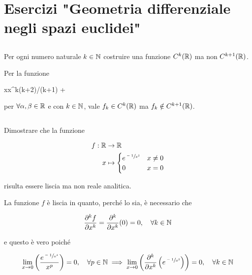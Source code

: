 \chapter{Esercizi "Geometria differenziale negli spazi euclidei"}

\tocless\section{}\label{es1-1}

\begin{tcolorbox}
	Per ogni numero naturale $ k \in \mathbb{N} $ costruire una funzione $ C^{k}(\mathbb{R}) $ ma non $ C^{k+1}(\mathbb{R}) $.
\end{tcolorbox}

Per la funzione

%
	{\R}{\R}%
	{x}{\alpha x^{k(k+2)/(k+1)} + \beta}
	
per $ \forall \alpha,\beta \in \mathbb{R} $ e con $ k \in \mathbb{N} $, vale $ f_{k} \in C^{k}(\mathbb{R}) $ ma $ f_{k} \notin C^{k+1}(\mathbb{R}) $.

\tocless\section{}\label{es1-2}

\begin{tcolorbox}
	Dimostrare che la funzione
	
	\begin{align}
		\begin{split}
			f : \R & \to \R\\
			x &\mapsto%
				\begin{cases}
					e^{\sfrac{-1}{x^{2}}} & x \neq 0\\
					0 & x = 0
				\end{cases}
		\end{split}
	\end{align}
	
	risulta essere liscia ma non reale analitica.
\end{tcolorbox}

La funzione $ f $ è liscia in quanto, perché lo sia, è necessario che

\begin{equation}
	\pdv[k]{f}{x} = \pdv[k]{x} (0) = 0 \qcomma \forall k \in \N
\end{equation}

e questo è vero poiché

\begin{equation}
	\lim_{x \to 0} \left( \dfrac{e^{\sfrac{-1}{x^{2}}}}{x^{p}} \right) = 0 \qcomma \forall p \in \N %
	\implies%
	\lim_{x \to 0} \left( \pdv[k]{x} \left( e^{\sfrac{-1}{x^{2}}} \right) \right) = 0 \qcomma \forall k \in \N
\end{equation}

